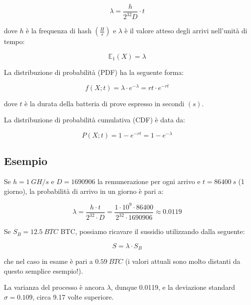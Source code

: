 \documentclass{article}
\begin{document}
\begin{equation}
    \lambda = \frac{h}{2^{32}D} \cdot t \label{lambda}
\end{equation}

dove $h$ è la frequenza di hash $(\frac{H}{s})$ e $\lambda$ è il valore atteso degli arrivi nell'unità di tempo:

\begin{equation}
    \mathbb{E}_{1}(X) = \lambda \label{E_lambda}
\end{equation}

La distribuzione di probabilità (PDF) ha la seguente forma:

\begin{equation}
    f(X; t) = \lambda \cdot e^{-\lambda} = rt \cdot e^{-rt}
\end{equation}

dove $t$ è la durata della batteria di prove espresso in  secondi $(s)$.

La distribuzione di probabilità cumulativa (CDF) è data da:

\begin{equation}
    P(X; t) = 1 - e^{-rt} = 1 - e^{-\lambda} \label{eq:CDF}
\end{equation}

\subsection{Esempio}

Se $h = 1 \ GH/s$ e $D = 1690906$ la remunerazione per ogni arrivo e $t = 86400 \ s$ (1 giorno), la probabilità di arrivo in un giorno è pari a:

\begin{equation}
    \lambda = \frac{h \cdot t}{2^{32} \cdot D} = \frac{1 \cdot 10^{9} \cdot 86400}{2^{32} \cdot 1690906} \approx 0.0119
\end{equation}

Se $S_{B} = 12.5 \ BTC$ BTC, possiamo ricavare il sussidio utilizzando dalla seguente:

\begin{equation}
    S = \lambda \cdot S_{B} \label{eq:lamdaToSubside}
\end{equation}

che nel caso in esame è pari a $0.59 \ BTC$ (i valori attuali sono molto distanti da questo semplice esempio!).

La varianza del processo è ancora $\lambda$, dunque 0.0119, e la deviazione standard $\sigma = 0.109$, circa 9.17 volte superiore.
\end{document}
